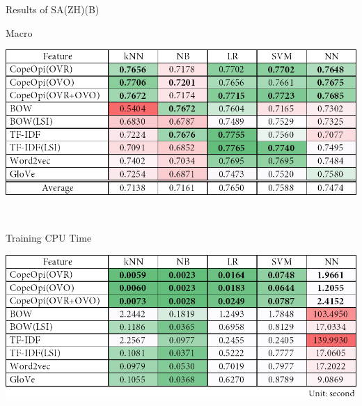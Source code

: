 \begin{table}[H]
\caption{Results of SA(ZH)(B)}
\label{tab:sa_zh_b}
\centering
\begin{subtable}{\textwidth}
	\centering
	\caption{Macro \fscore{}}
	\includegraphics[width=\resultfigwidth]{chapters/ch4/table/sa/SA(ZH)(B).png}
\end{subtable}
\\[\tblskip]
\begin{subtable}{\textwidth}
	\centering
	\caption{Training CPU Time}
	\includegraphics[width=\resultfigwidth]{chapters/ch4/table/sa/SA(ZH)(B)T.png}
\end{subtable}
\end{table}